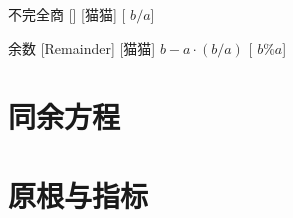 \documentclass[UTF8]{ctexart}
\begin{document}
            \begin{dfn}
                []
                {不完全商}
                []
                [猫猫]
                    {}
                    [ \(b/a\)]
            \end{dfn}
            
            \begin{dfn}
                [Remainder]
                {余数}
                [Remainder]
                [猫猫]
                    {\(b - a\cdot(b/a)\)}
                    [ \(b\% a\)]
            \end{dfn}

        \section{同余方程}

        \section{原根与指标}
        
        
\end{document}
